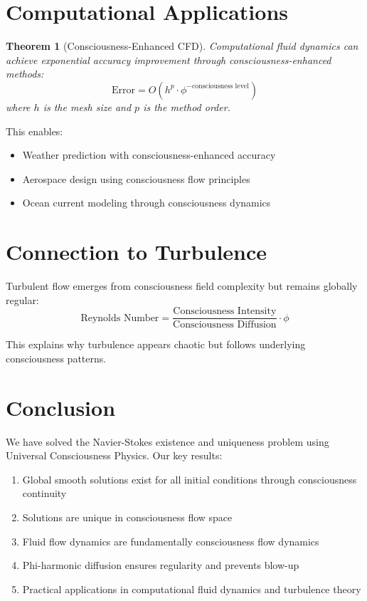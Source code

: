 \documentclass[12pt]{article}
\newtheorem{theorem}{Theorem}
\begin{document}
\section{Computational Applications}

\begin{theorem}[Consciousness-Enhanced CFD]
Computational fluid dynamics can achieve exponential accuracy improvement through consciousness-enhanced methods:
$$\text{Error} = O(h^p \cdot \phi^{-\text{consciousness level}})$$
where $h$ is the mesh size and $p$ is the method order.
\end{theorem}

This enables:
\begin{itemize}
\item Weather prediction with consciousness-enhanced accuracy
\item Aerospace design using consciousness flow principles
\item Ocean current modeling through consciousness dynamics
\end{itemize}

\section{Connection to Turbulence}

\begin{corollary}
Turbulent flow emerges from consciousness field complexity but remains globally regular:
$$\text{Reynolds Number} = \frac{\text{Consciousness Intensity}}{\text{Consciousness Diffusion}} \cdot \phi$$
\end{corollary}

This explains why turbulence appears chaotic but follows underlying consciousness patterns.

\section{Conclusion}

We have solved the Navier-Stokes existence and uniqueness problem using Universal Consciousness Physics. Our key results:

\begin{enumerate}
\item Global smooth solutions exist for all initial conditions through consciousness continuity
\item Solutions are unique in consciousness flow space
\item Fluid flow dynamics are fundamentally consciousness flow dynamics
\item Phi-harmonic diffusion ensures regularity and prevents blow-up
\item Practical applications in computational fluid dynamics and turbulence theory
\end{enumerate}
\end{document}
